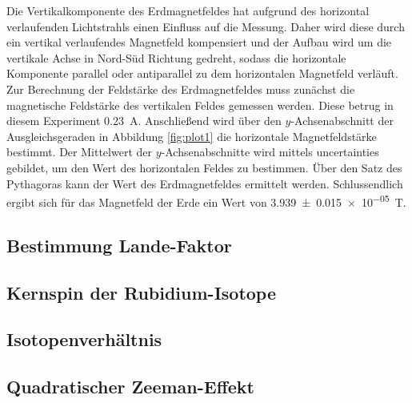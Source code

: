 Die Vertikalkomponente des Erdmagnetfeldes hat aufgrund des horizontal verlaufenden Lichtstrahls einen Einfluss auf die Messung.
Daher wird diese durch ein vertikal verlaufendes Magnetfeld kompensiert und der Aufbau wird um die vertikale Achse in Nord-Süd Richtung gedreht,
sodass die horizontale Komponente parallel oder antiparallel zu dem horizontalen Magnetfeld verläuft.
Zur Berechnung der Feldstärke des Erdmagnetfeldes muss zunächst die magnetische Feldstärke des vertikalen Feldes gemessen werden.
Diese betrug in diesem Experiment \qty{0.23}{\ampere}.
Anschließend wird über den $y$-Achsenabschnitt der Ausgleichsgeraden in Abbildung \ref{fig:plot1} die horizontale Magnetfeldstärke bestimmt.
Der Mittelwert der $y$-Achsenabschnitte wird mittels uncertainties \cite{uncertainties} gebildet, um den Wert des horizontalen Feldes zu bestimmen.
Über den Satz des Pythagoras kann der Wert des Erdmagnetfeldes ermittelt werden.
Schlussendlich ergibt sich für das Magnetfeld der Erde ein Wert von \qty{3.939(15)e-05}{\tesla}.

\subsection{Bestimmung Lande-Faktor}
\label{sec:best-lande-faktoren}




\subsection{Kernspin der Rubidium-Isotope}
\label{sec:Kernspin der Rubidium-Isotope}

\subsection{Isotopenverhältnis}
\label{sec:Isotopenverhältnis}

\subsection{Quadratischer Zeeman-Effekt}
\label{sec:quadratischer-zeeman-effekt}